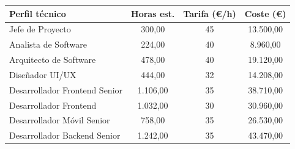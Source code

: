 \begin{table}[htbp]
    \centering
    \renewcommand{\arraystretch}{1.2}
    \begin{tabular}{lccc}
        \toprule
        \textbf{Perfil técnico}                                                                                                                                        & \textbf{Horas est.} & \textbf{Tarifa (€/h)} & \textbf{Coste (€)}  \\
        \midrule
        Jefe de Proyecto                                                                                                                                               & 300,00              & 45                    & 13.500,00           \\
        Analista de Software                                                                                                                                           & 224,00              & 40                    & 8.960,00            \\
        Arquitecto de Software                                                                                                                                         & 478,00              & 40                    & 19.120,00           \\
        Diseñador UI/UX                                                                                                                                                & 444,00              & 32                    & 14.208,00           \\
        Desarrollador Frontend Senior                                                                                                                                  & 1.106,00            & 35                    & 38.710,00           \\
        Desarrollador Frontend                                                                                                                                         & 1.032,00            & 30                    & 30.960,00           \\
        Desarrollador Móvil Senior                                                                                                                                     & 758,00              & 35                    & 26.530,00           \\
        Desarrollador Backend Senior                                                                                                                                   & 1.242,00            & 35                    & 43.470,00           \\

\end{tabular}
\end{table}
